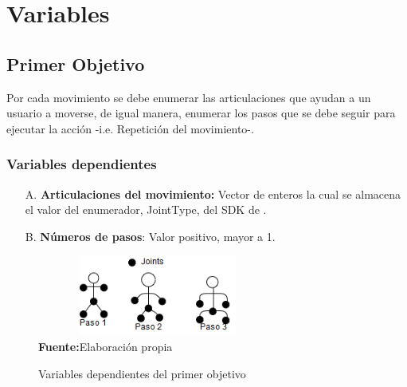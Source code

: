 \section{Variables} \label{vr}
\subsection{Primer Objetivo} \label{vr:1o}
Por cada movimiento se debe enumerar las articulaciones que ayudan a un usuario a moverse, de igual manera, enumerar los pasos que se debe seguir para ejecutar la acci\'on -i.e. Repetici\'on del movimiento-.
\subsubsection{Variables dependientes} \label{vr:1o:dep}
\begin{enumerate}
	\item[A.] \textbf{Articulaciones del movimiento:}  Vector de enteros la cual se almacena el valor del enumerador, JointType, del SDK de  .
	\item[B.] \textbf{N\'umeros de pasos}: Valor positivo, mayor a 1.
\end{enumerate}
	\begin{figure}[H]
	\caption{Variables dependientes del primer objetivo}
	\label{fig:vardep1}
	\centering
	\includegraphics[width=300px,height=100px]{graphics/var-1obj.png} \\
	\textbf{Fuente:}Elaboraci\'on propia 
\end{figure}
\medbreak
